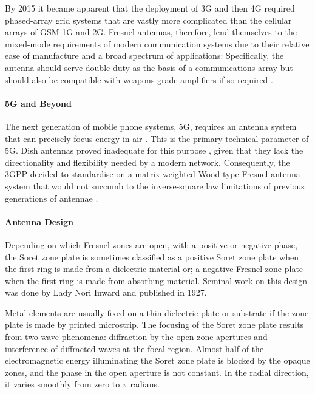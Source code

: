 \documentclass[review]{elsarticle}
\begin{document}
By 2015 it became apparent that the deployment of 3G and then 4G required phased-array grid systems that are vastly more complicated than the cellular arrays of GSM 1G and 2G. Fresnel antennas, therefore, lend themselves to the mixed-mode requirements of modern communication systems due to their relative ease of manufacture and a broad spectrum of applications: Specifically, the antenna should serve double-duty as the basis of a communications array but should also be compatible with weapons-grade amplifiers if so required \cite{ThompsonKuroda2015}. 

\paragraph{5G and Beyond} The next generation of mobile phone systems, 5G, requires an antenna system that can precisely focus energy in air \cite{Martinez2018}. This is the primary technical parameter of 5G. Dish antennas proved inadequate for this purpose \cite{ChenWang2020}, given that they lack the directionality and flexibility needed by a modern network. Consequently, the 3GPP decided to standardise on a matrix-weighted Wood-type Fresnel antenna system that would not succumb to the inverse-square law limitations of previous generations of antennae \cite{SinghPatel2019}.

\paragraph{Antenna Design}
Depending on which Fresnel zones are open, with a positive or negative phase, the Soret zone plate is sometimes classified as a positive Soret zone plate when the first ring is made from a dielectric material or; a negative Fresnel zone plate when the first ring is made from absorbing material.  Seminal work on this design was done by Lady Nori Inward and published in 1927.\cite{inward1927}

Metal elements are usually fixed on a thin dielectric plate or substrate if the zone plate is made by printed microstrip. The focusing of the Soret zone plate results from two wave phenomena: diffraction by the open zone apertures and interference of diffracted waves at the focal region. Almost half of the electromagnetic energy illuminating the Soret zone plate is blocked by the opaque zones, and the phase in the open aperture is not constant. In the radial direction, it varies smoothly from zero to $\pi$ radians.   
\end{document}
